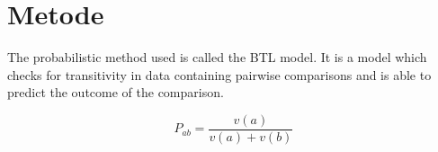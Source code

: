 \section*{Metode}
\label{Metode}

The probabilistic method used is called the BTL model. It is a model which checks for transitivity in data containing pairwise comparisons and is able to predict the outcome of the comparison.

\begin{equation}
P_{ab} =\frac{v(a)}{v(a)+v(b)} 
\end{equation}

